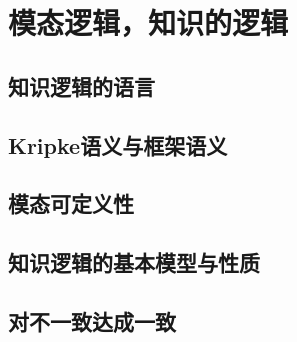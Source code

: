 \chapter{模态逻辑，知识的逻辑}\label{chap:modal-logic}

\section{知识逻辑的语言}

\section{Kripke语义与框架语义}

\section{模态可定义性}

\section{知识逻辑的基本模型与性质}

\section{对不一致达成一致}

